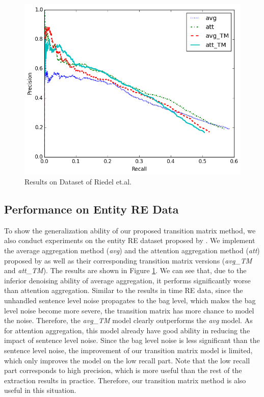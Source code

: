 \begin{figure}[htbp]
\includegraphics[width=0.9\linewidth]{figures/re_att_avg_cmp_exp.png}
\caption{Results on Dataset of Riedel et.al.} 
\label{fig: Riedel_res}
\end{figure}

\subsection{Performance on Entity RE Data}
To show the generalization ability of our proposed transition matrix method, we also conduct experiments on the entity RE dataset proposed by \cite{riedel2010modeling}. We implement the average aggregation method (\emph{avg}) and the attention aggregation method (\emph{att}) proposed by \cite{lin2016neural} as well as their corresponding transition matrix versions (\emph{avg\_TM} and \emph{att\_TM}). The results are shown in Figure \ref{fig: Riedel_res}. We can see that, due to the inferior denoising ability of average aggregation, it performs significantly worse than attention aggregation. Similar to the results in time RE data, since the unhandled sentence level noise propagates to the bag level, which makes the bag level noise become more severe, the transition matrix has more chance to model the noise. Therefore, the \emph{avg\_TM} model clearly outperforms the \emph{avg} model. As for attention aggregation, this model already have good ability in reducing the impact of sentence level noise. Since the bag level noise is less significant than the sentence level noise, the improvement of our transition matrix model is limited, which only improves the model on the low recall part. Note that the low recall part corresponds to high precision, which is more useful than the rest of the extraction results in practice. Therefore, our transition matrix method is also useful in this situation.

